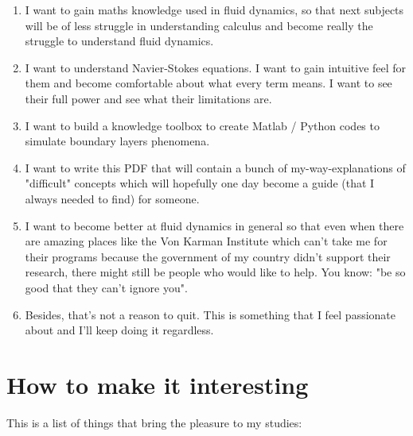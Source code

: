 \documentclass[12pt]{report}
\begin{document}
\begin{enumerate}

\item I want to gain maths knowledge used in fluid dynamics, so that next subjects will be of less struggle in understanding calculus and become really the struggle to understand fluid dynamics.

\item I want to understand Navier-Stokes equations. I want to gain intuitive feel for them and become comfortable about what every term means. I want to see their full power and see what their limitations are.

\item I want to build a knowledge toolbox to create Matlab / Python codes to simulate boundary layers phenomena.

\item I want to write this PDF that will contain a bunch of my-way-explanations of "difficult" concepts which will hopefully one day become a guide (that I always needed to find) for someone.

\item I want to become better at fluid dynamics in general so that even when there are amazing places like the Von Karman Institute which can't take me for their programs because the government of my country didn't support their research, there might still be people who would like to help. You know: "be so good that they can't ignore you".

\item Besides, that's not a reason to quit. This is something that I feel passionate about and I'll keep doing it regardless.

\end{enumerate}



\section{How to make it interesting} \label{chap:interesting}

This is a list of things that bring the pleasure to my studies:
\end{document}
